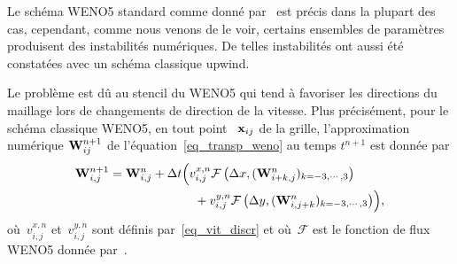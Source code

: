 \documentclass[main.tex]{subfiles}
\begin{document}


Le schéma WENO5 standard comme donné par~\cite{Liu1994} est précis dans la plupart des cas, cependant, comme nous venons de le voir, certains ensembles de paramètres %
 produisent des instabilités numériques. De telles instabilités ont aussi été constatées avec un schéma classique upwind. 

Le problème est dû au stencil du WENO5 qui tend à favoriser les directions du maillage lors de changements de direction de la vitesse. 
Plus précisément, pour le schéma classique WENO5, en tout point 
~$\mathbf{x}_{ij}$ de la grille, l'approximation numérique 
${\bf W}^{n+1}_{ij}$ de l'équation~\eqref{eq_transp_weno} au temps 
$t^{n+1}$ est donnée par
\begin{equation}\label{eq:WENO5}
\begin{aligned}
{\bf W}^{n+1}_{i,j}={\bf W}^n_{i,j} + \Delta t & \Bigl(v_{i,j}^{x,n}
\mathcal{F}\left(\Delta x,({\bf W}^n_{i+k,j})_{k=-3,\cdots, 3}\right) \\
&\quad +v_{i,j}^{y,n} \mathcal{F}\left(\Delta y,({\bf W}^n_{i,j+k})_{k=-3,\cdots, 3}\right)\Bigr),
\end{aligned}
\end{equation}
où~$v_{i,j}^{x,n} $ et~$v_{i,j}^{y,n}$ sont définis par~\eqref{eq_vit_discr} et où~$\mathcal{F}$ est le fonction de flux WENO5 donnée par~\cite{Liu1994}. 
\end{document}

